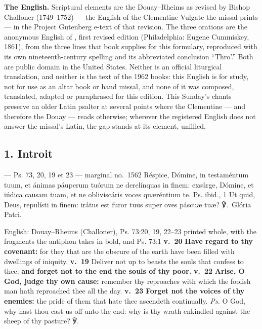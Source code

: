 \textbf{The English.} Scriptural elements are the Douay--Rheims as revised by
Bishop Challoner (1749--1752) --- the English of the Clementine Vulgate the
missal prints --- in the Project Gutenberg e-text of that revision. The three
orations are the anonymous English of , first revised edition
(Philadelphia: Eugene Cummiskey, 1861), from the three lines that book
supplies for this formulary, reproduced with its own nineteenth-century
spelling and its abbreviated conclusion ``Thro'.'' Both are public domain in
the United States. Neither is an official liturgical translation, and neither
is the text of the 1962 books: this English is for study, not for use as an
altar book or hand missal, and none of it was composed, translated, adapted or paraphrased
for this edition. This Sunday's chants
preserve an older Latin psalter at several points where the Clementine ---
and therefore the Douay --- reads otherwise; wherever the registered English
does not answer the missal's Latin, the gap stands at its element, unfilled.

\elementguard
\subsection*{1. Introit }

\begin{appointedlatin}{ --- Ps. 73, 20, 19 et 23 --- marginal no.\ 1562}
Réspice, Dómine, in testaméntum tuum, et ánimas páuperum tuórum ne derelínquas
in finem: exsúrge, Dómine, et iúdica causam tuam, et ne obliviscáris voces
quæréntium te. \textnormal{Ps. ibid., 1} Ut quid, Deus, repulísti in finem:
irátus est furor tuus super oves páscuæ tuæ? ℣.~Glória Patri.
\end{appointedlatin}

\begin{namedtranslation}{English: Douay--Rheims (Challoner), Ps. 73:20, 19, 22--23 printed whole, with the fragments the antiphon takes in bold, and Ps. 73:1}
\textbf{v.~20} \textbf{Have regard to thy covenant:} for they that are the
obscure of the earth have been filled with dwellings of iniquity.
\textbf{v.~19} Deliver not up to beasts the souls that confess to thee:
\textbf{and forget not to the end the souls of thy poor.} \textbf{v.~22}
\textbf{Arise, O God, judge thy own cause:} remember thy reproaches with which
the foolish man hath reproached thee all the day. \textbf{v.~23}
\textbf{Forget not the voices of thy enemies:} the pride of them that hate
thee ascendeth continually. \textit{Ps.} O God, why hast thou cast us off unto
the end: why is thy wrath enkindled against the sheep of thy pasture?
℣.~
\end{namedtranslation}

